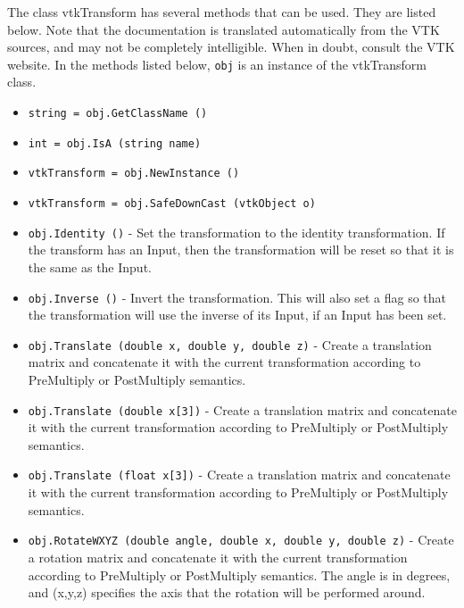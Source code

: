 The class vtkTransform has several methods that can be used.
  They are listed below.
Note that the documentation is translated automatically from the VTK sources,
and may not be completely intelligible.  When in doubt, consult the VTK website.
In the methods listed below, \verb|obj| is an instance of the vtkTransform class.
\begin{itemize}
\item  \verb|string = obj.GetClassName ()|

\item  \verb|int = obj.IsA (string name)|

\item  \verb|vtkTransform = obj.NewInstance ()|

\item  \verb|vtkTransform = obj.SafeDownCast (vtkObject o)|

\item  \verb|obj.Identity ()| -  Set the transformation to the identity transformation.  If 
 the transform has an Input, then the transformation will be
 reset so that it is the same as the Input.

\item  \verb|obj.Inverse ()| -  Invert the transformation.  This will also set a flag so that
 the transformation will use the inverse of its Input, if an Input
 has been set.

\item  \verb|obj.Translate (double x, double y, double z)| -  Create a translation matrix and concatenate it with the current
 transformation according to PreMultiply or PostMultiply semantics.

\item  \verb|obj.Translate (double x[3])| -  Create a translation matrix and concatenate it with the current
 transformation according to PreMultiply or PostMultiply semantics.

\item  \verb|obj.Translate (float x[3])| -  Create a translation matrix and concatenate it with the current
 transformation according to PreMultiply or PostMultiply semantics.

\item  \verb|obj.RotateWXYZ (double angle, double x, double y, double z)| -  Create a rotation matrix and concatenate it with the current
 transformation according to PreMultiply or PostMultiply semantics.
 The angle is in degrees, and (x,y,z) specifies the axis that the
 rotation will be performed around. 


\end{itemize}

